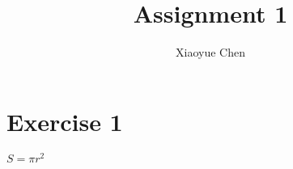 \documentclass[a4paper,11pt]{article}
\title{Assignment 1}
\author{Xiaoyue Chen}
\begin{document}
\maketitle
\tableofcontents

\begin{abstract}
\end{abstract}

\section{Exercise 1}
$S = \pi r^2$
\end{document}
